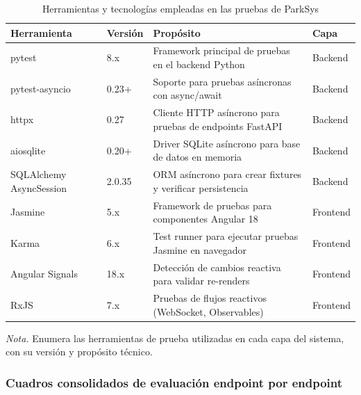 \begin{table}[htbp]
\caption{Herramientas y tecnologías empleadas en las pruebas de ParkSys}
\label{tab:herramientas_pruebas}
\begin{tabular}{@{}p{3cm} p{1.5cm} p{8cm} p{2.5cm}@{}}
\toprule
\textbf{Herramienta} & \textbf{Versión} & \textbf{Propósito} & \textbf{Capa} \\
\midrule
pytest & 8.x & Framework principal de pruebas en el backend Python & Backend \\
pytest-asyncio & 0.23+ & Soporte para pruebas asíncronas con async/await & Backend \\
httpx & 0.27 & Cliente HTTP asíncrono para pruebas de endpoints FastAPI & Backend \\
aiosqlite & 0.20+ & Driver SQLite asíncrono para base de datos en memoria & Backend \\
SQLAlchemy AsyncSession & 2.0.35 & ORM asíncrono para crear fixtures y verificar persistencia & Backend \\
Jasmine & 5.x & Framework de pruebas para componentes Angular 18 & Frontend \\
Karma & 6.x & Test runner para ejecutar pruebas Jasmine en navegador & Frontend \\
Angular Signals & 18.x & Detección de cambios reactiva para validar re-renders & Frontend \\
RxJS & 7.x & Pruebas de flujos reactivos (WebSocket, Observables) & Frontend \\
\bottomrule
\end{tabular}
\par\vspace{0.2cm}
\textit{Nota.} Enumera las herramientas de prueba utilizadas en cada capa del sistema, con su versión y propósito técnico.
\end{table} 

\subsubsection{Cuadros consolidados de evaluación endpoint por endpoint}




